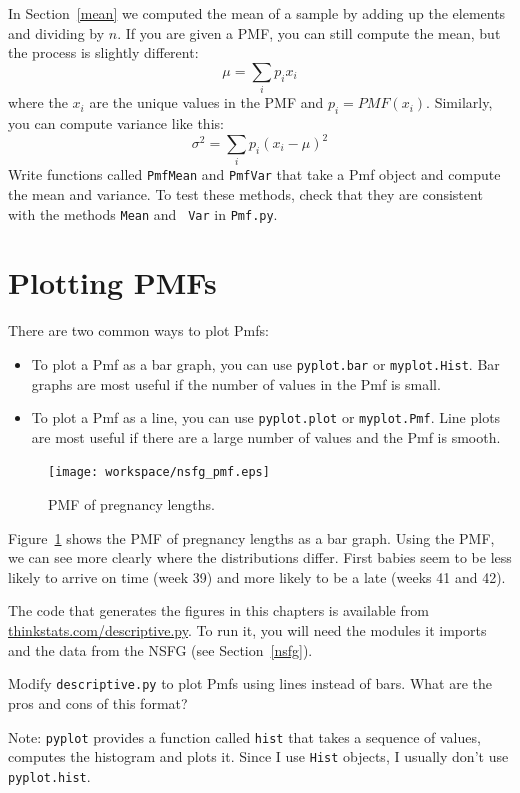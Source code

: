\documentclass[12pt]{book}
\begin{document}
\begin{ex}

In Section~\ref{mean} we computed the mean of a sample by adding up
the elements and dividing by $n$.  If you are given a PMF, you can
still compute the mean, but the process is slightly different:
%
\[ \mu = \sum_i p_i x_i \]
%
where the $x_i$ are the unique values in the PMF and $p_i = PMF(x_i)$.
Similarly, you can compute variance like this:
%
\[ \sigma^2 = \sum_i p_i (x_i - \mu)^2\]
% 
Write functions called {\tt PmfMean} and {\tt PmfVar} that take a
Pmf object and compute the mean and variance.  To test these methods,
check that they are consistent with the methods {\tt Mean} and {\tt
  Var} in {\tt Pmf.py}.

\end{ex}




\section{Plotting PMFs}

There are two common ways to plot Pmfs:

\begin{itemize}

\item To plot a Pmf as a bar graph, you can use {\tt pyplot.bar}
or {\tt myplot.Hist}.  Bar graphs are most useful if the number
of values in the Pmf is small.

\item To plot a Pmf as a line, you can use {\tt pyplot.plot}
or {\tt myplot.Pmf}.  Line plots are most useful if there are
a large number of values and the Pmf is smooth.

\end{itemize}

\begin{figure}
\centerline{\texttt{[image: workspace/nsfg\_pmf.eps]}}
\caption{PMF of pregnancy lengths.}
\label{nsfg_pmf}
\end{figure}

Figure~\ref{nsfg_pmf} shows the PMF of pregnancy lengths as a bar
graph.  Using the PMF, we can see more clearly where the distributions
differ.  First babies seem to be less likely to arrive on time (week
39) and more likely to be a late (weeks 41 and 42).

\begin{ex}

The code that generates the figures in this chapters is available from
\url{thinkstats.com/descriptive.py}.  To run it, you will need the
modules it imports and the data from the NSFG (see
Section~\ref{nsfg}).

Modify {\tt descriptive.py} to plot Pmfs using lines instead of
bars.  What are the pros and cons of this format?

Note: {\tt pyplot} provides a function called {\tt hist} that
takes a sequence of values, computes the histogram and plots it.
Since I use {\tt Hist} objects, I usually don't use {\tt pyplot.hist}.

\end{ex}
\end{document}
